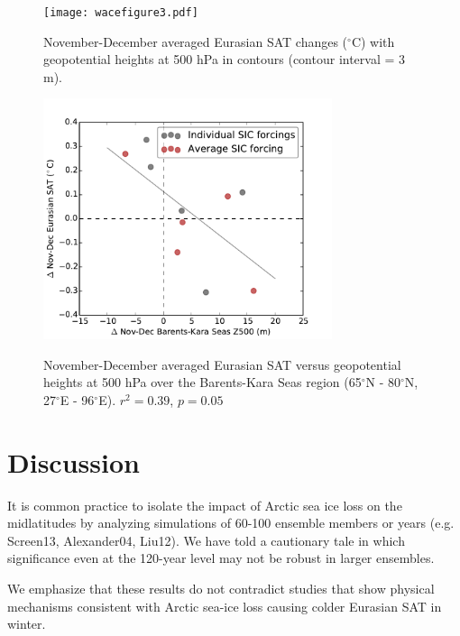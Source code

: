 \documentclass[grl]{AGUTeX}  %
\begin{document}
\begin{article}
\begin{figure}[t]
  \noindent\texttt{[image: wacefigure3.pdf]} \\ 
  \caption{November-December averaged Eurasian SAT changes ($^\circ$C) with geopotential heights at 500 hPa in contours (contour interval = 3 m).
}\label{fig:fig3}
\end{figure} %

\begin{figure}[t]
  \noindent\includegraphics[width=20pc,angle=0]{fig4.pdf} \\ 
  \caption{November-December averaged Eurasian SAT versus geopotential heights at 500 hPa over the Barents-Kara Seas region (65$^\circ$N - 80$^\circ$N, 27$^\circ$E - 96$^\circ$E). $r^2 = 0.39$, $p = 0.05$
}\label{fig:fig4}
\end{figure}

\section{Discussion}

It is common practice to isolate the impact of Arctic sea ice loss on the midlatitudes by analyzing simulations of 60-100 ensemble members or years (e.g. Screen13, Alexander04, Liu12). We have told a cautionary tale in which significance even at the 120-year level may not be robust in larger ensembles.

We emphasize that these results do not contradict studies that show physical mechanisms consistent with Arctic sea-ice loss causing colder Eurasian SAT in winter. 


\end{article}
\end{document}
